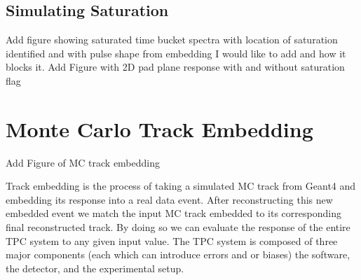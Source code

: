 \subsection{Simulating Saturation}
Add figure showing saturated time bucket spectra with location of saturation identified and with pulse shape from embedding I would like to add and how it blocks it.
Add Figure with 2D pad plane response with and without saturation flag


\section{Monte Carlo Track Embedding}
Add Figure of MC track embedding 



Track embedding is the process of taking a simulated MC track from Geant4 and embedding its response into a real data event. After reconstructing this new embedded event we match the input MC track embedded to its corresponding final reconstructed track.  By doing so we can evaluate the response of the entire TPC system to any given input value. The TPC system is composed of three major components (each which can introduce errors and or biases) the software, the detector, and the experimental setup.  

